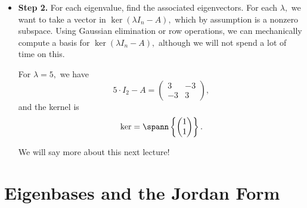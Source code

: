 \begin{itemize}
    If $A'$ is similar to $A,$ then they have the same characteristic polynomial, since the determinant is basis-invariant. 
    
    \begin{proposition}
    Given $\lambda \in F,$ $\lambda$ is an eigenvalue for $A$ if and only if $p_A(\lambda) = 0$; that is, if and only if $\lambda$ is a root of $p_A(t).$
    \end{proposition}
    
    For example, for our earlier example, the eigenvalues would be $-1$ and $5$, since $t^2 - 4t - 5 = (t + 1)(t - 5).$
    
    As a caveat, if $F$ is an arbitrary field, there may not be any roots. For example, a rotation matrix over $\RR$ does not have any real eigenvalues. However, if $F = \CC,$ there will always be $n$ roots (not necessarily distinct), and so there will always be eigenvalues. 
    
    \item \textbf{Step 2.} For each eigenvalue, find the associated eigenvectors. For each $\lambda,$ we want to take a vector in $\ker(\lambda I_n - A),$ which by assumption is a nonzero subspace. Using Gaussian elimination or row operations, we can mechanically compute a basis for $\ker(\lambda I_n - A),$ although we will not spend a lot of time on this. 
    
    \begin{example}
    For $\lambda = 5,$ we have \[5 \cdot I_2 - A = \begin{pmatrix} 3 & -3 \\ -3 & 3 \end{pmatrix},\] and the kernel is \[\ker = \spann \left\{\begin{pmatrix} 1 \\ 1 \end{pmatrix}\right\}.\]
    \end{example}
    
    We will say more about this next lecture!
\end{itemize}

\newpage


\section{Eigenbases and the Jordan Form}


